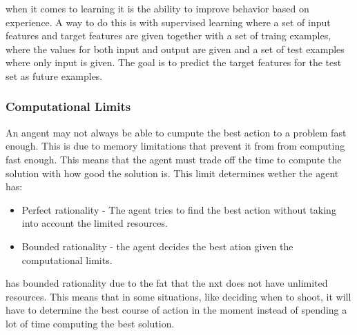 when it comes to learning it is the ability to improve
behavior based on experience. A way to do this is with supervised learning where
a set of input features and target features are given together with a set of
traing examples, where the values for both input and output are given and a set
of test examples where only input is given. The goal is to predict the target
features for the test set as future examples.


\subsubsection{Computational Limits}
An angent may not always be able to cumpute the best action to a problem fast
enough. This is due to memory limitations that prevent it from from computing
fast enough. This means that the agent must trade off the time to compute the
solution with how good the solution is. This limit determines wether the agent
has:


\begin{itemize}
  \item Perfect rationality - The agent tries to find the best action without
  taking into account the limited resources.
  \item Bounded rationality - the agent decides the best ation given the
  computational limits.
\end{itemize}

\namep has bounded rationality due to the fat that the nxt does not have
unlimited resources. This means that in some situations, like deciding when
to shoot, it will have to determine the best course of action in the moment
instead of spending a lot of time computing the best solution. 
